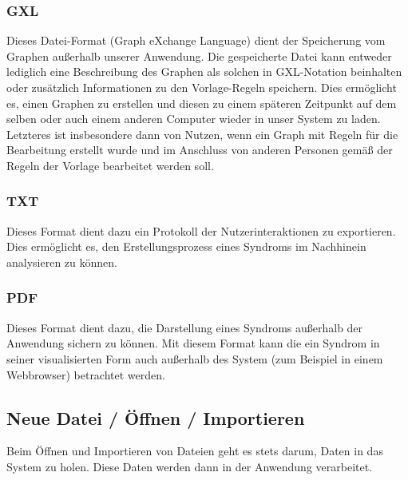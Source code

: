 \documentclass[enabledeprecatedfontcommands,fontsize=11pt,paper=a4,twoside]{scrartcl}
\newcounter{one}
\begin{document}
	\subsubsection{GXL}
	Dieses Datei-Format (Graph eXchange Language) dient der Speicherung vom Graphen außerhalb unserer Anwendung. Die gespeicherte Datei kann entweder lediglich eine Beschreibung des Graphen als solchen in GXL-Notation beinhalten oder zusätzlich Informationen zu den Vorlage-Regeln speichern. Dies ermöglicht es, einen Graphen zu erstellen und diesen zu einem späteren Zeitpunkt auf dem selben oder auch einem anderen Computer wieder in unser System zu laden. Letzteres ist insbesondere dann von Nutzen, wenn ein Graph mit Regeln für die Bearbeitung erstellt wurde und im Anschluss von anderen Personen gemäß der Regeln der Vorlage bearbeitet werden soll.
	
	\subsubsection{TXT}
	Dieses Format dient dazu ein Protokoll der Nutzerinteraktionen zu exportieren. Dies ermöglicht es, den Erstellungsprozess eines Syndroms im Nachhinein analysieren zu können.
	
	\subsubsection{PDF}
	Dieses Format dient dazu, die Darstellung eines Syndroms außerhalb der Anwendung sichern zu können. Mit diesem Format kann die ein Syndrom in seiner visualisierten Form auch außerhalb des System (zum Beispiel in einem Webbrowser) betrachtet werden. 
	

		\newpage
	\subsection{Neue Datei / Öffnen / Importieren} \label{import}
	Beim Öffnen und Importieren von Dateien geht es stets darum, Daten in das System zu holen. Diese Daten werden dann in der Anwendung verarbeitet.
	
\end{document}
